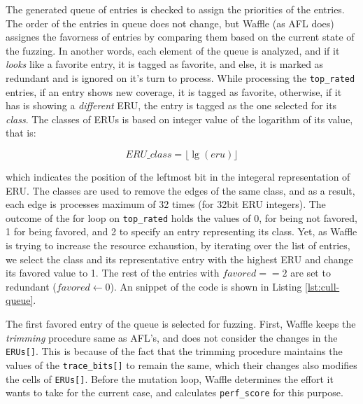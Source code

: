 


The generated queue of entries is checked to assign the priorities of the entries. The order of the entries in queue does not change, but Waffle (as AFL does) assignes the favorness of entries by comparing them based on the current state of the fuzzing. In another words, each element of the queue is analyzed, and if it \textit{looks} like a favorite entry, it is tagged as favorite, and else, it is marked as redundant and is ignored on it's turn to process. While processing the \texttt{top\_rated} entries, if an entry shows new coverage, it is tagged as favorite, otherwise, if it has is showing a \textit{different} ERU, the entry is tagged as the one selected for its \textit{class}. The classes of ERUs is based on integer value of the logarithm of its value, that is:

\begin{equation}
  \label{eq:eru-class}
  ERU\_class = \lfloor \lg(eru) \rfloor  
\end{equation}

which indicates the position of the leftmost bit in the integeral representation of ERU. The classes are used to remove the edges of the same class, and as a result, each edge is processes maximum of 32 times (for 32bit ERU integers). The outcome of the for loop on \texttt{top\_rated} holds the values of 0, for being not favored, 1 for being favored, and 2 to specify an entry representing its class. Yet, as Waffle is trying to increase the resource exhaustion, by iterating over the list of entries, we select the class and its representative entry with the highest ERU and change its favored value to 1. The rest of the entries with $favored == 2$ are set to redundant ($ favored \leftarrow 0 $). An snippet of the code is shown in Listing \ref{lst:cull-queue}.




The first favored entry of the queue is selected for fuzzing. First, Waffle keeps the \textit{trimming} procedure same as AFL's, and does not consider the changes in the \texttt{ERUs[]}. This is because of the fact that the trimming procedure maintains the values of the \texttt{trace\_bits[]} to remain the same, which their changes also modifies the cells of \texttt{ERUs[]}. Before the mutation loop, Waffle determines the effort it wants to take for the current case, and calculates \texttt{perf\_score} for this purpose.



